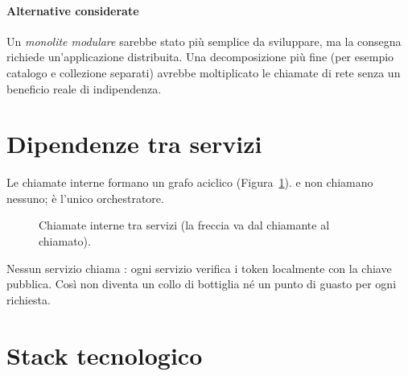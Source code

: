 \documentclass[11pt,a4paper]{report}
\begin{document}
\paragraph{Alternative considerate}
Un \emph{monolite modulare} sarebbe stato più semplice da sviluppare, ma la consegna richiede un'applicazione distribuita. Una decomposizione più fine (per esempio catalogo e collezione separati) avrebbe moltiplicato le chiamate di rete senza un beneficio reale di indipendenza.

\section{Dipendenze tra servizi}

Le chiamate interne formano un grafo aciclico (Figura~\ref{fig:deps}).  e  non chiamano nessuno;  è l'unico orchestratore.

\begin{figure}[ht]
\centering
{}
\caption{Chiamate interne tra servizi (la freccia va dal chiamante al chiamato).}
\label{fig:deps}
\end{figure}

Nessun servizio chiama : ogni servizio verifica i token localmente con la chiave pubblica. Così  non diventa un collo di bottiglia né un punto di guasto per ogni richiesta.

\section{Stack tecnologico}
\end{document}
